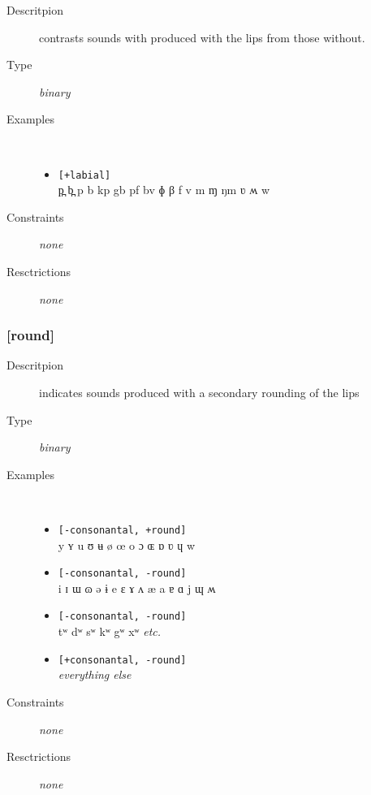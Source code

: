 \documentclass[10pt,letterpaper]{article}
\begin{document}

\begin{description}
\item[Descritpion] contrasts sounds with produced with the lips from those without.
\item[Type] \emph{binary}
\item[Examples]\
  \begin{itemize}
    \item \texttt{[+labial]}\\
    p̪ b̪ p b kp gb pf bv ɸ β f v m ɱ ŋm ʋ ʍ w
  \end{itemize}
\item[Constraints] \emph{none}
\item[Resctrictions] \emph{none}
\end{description}

\subsubsection{[round]}
\label{ssub:feature_round}

\begin{description}
\item[Descritpion] indicates sounds produced with a secondary rounding of the lips
\item[Type] \emph{binary}
\item[Examples]\
  \begin{itemize}
    \item \texttt{[-consonantal, +round]}\\
    y ʏ u ʊ ʉ ø œ o ɔ ɶ ɒ ʋ ɥ w 
    \item \texttt{[-consonantal, -round]}\\
    i ɪ ɯ ɷ ə ɨ e ɛ ɤ ʌ æ a ɐ ɑ j ɰ ʍ 
    \item \texttt{[-consonantal, -round]}\\
    tʷ dʷ sʷ kʷ gʷ xʷ \emph{etc.}
    \item \texttt{[+consonantal, -round]}\\
    \emph{everything else}
  \end{itemize}
\item[Constraints] \emph{none}
\item[Resctrictions] \emph{none}
\end{description}
\end{document}

